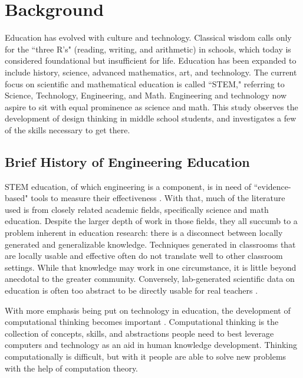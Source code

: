 \chapter{Background}
\label{chap:background}

Education has evolved with culture and technology.  Classical wisdom calls only for the ``three R's" (reading, writing, and arithmetic) in schools, which today is considered foundational but insufficient for life. Education has been expanded to include history, science, advanced mathematics, art, and technology. The current focus on scientific and mathematical education is called ``STEM," referring to Science, Technology, Engineering, and Math. Engineering and technology now aspire to sit with equal prominence as science and math.  This study observes the development of design thinking in middle school students, and investigates a few of the skills necessary to get there.

\section{Brief History of Engineering Education}

STEM education, of which engineering is a component, is in need of ``evidence-based" tools to measure their effectiveness \citep{csed-guzdial}. With that, much of the literature used is from closely related academic fields, specifically science and math education. Despite the larger depth of work in those fields, they all succumb to a problem inherent in education research: there is a disconnect between locally generated and generalizable knowledge. Techniques generated in classrooms that are locally usable and effective often do not translate well to other classroom settings. While that knowledge may work in one circumstance, it is little beyond anecdotal to the greater community. Conversely, lab-generated scientific data on education is often too abstract to be directly usable
for real teachers \citep{sandoval}.

With more emphasis being put on technology in education, the development of computational thinking becomes important \citep{p33-wing}. Computational thinking is the collection of concepts, skills, and abstractions people need to best leverage computers and technology as an aid in human knowledge development. Thinking computationally is difficult, but with it people are able to solve new problems with the help of computation theory. 

